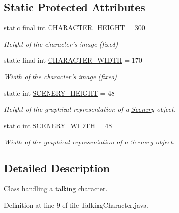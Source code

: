 \subsection*{Static Protected Attributes}
\begin{DoxyCompactItemize}
\item 
static final int \hyperlink{classworld_1_1character_1_1_character_a31596c03022d61aeb8aac56f149309be}{C\-H\-A\-R\-A\-C\-T\-E\-R\-\_\-\-H\-E\-I\-G\-H\-T} = 300
\begin{DoxyCompactList}\small\item\em Height of the character's image (fixed) \end{DoxyCompactList}\item 
static final int \hyperlink{classworld_1_1character_1_1_character_a2a46ba03b3e10896b7757f891336e8b8}{C\-H\-A\-R\-A\-C\-T\-E\-R\-\_\-\-W\-I\-D\-T\-H} = 170
\begin{DoxyCompactList}\small\item\em Width of the character's image (fixed) \end{DoxyCompactList}\item 
static int \hyperlink{classworld_1_1scenery_1_1_scenery_a106e53ae6e1647395740237ccce7f363}{S\-C\-E\-N\-E\-R\-Y\-\_\-\-H\-E\-I\-G\-H\-T} = 48
\begin{DoxyCompactList}\small\item\em Height of the graphical representation of a \hyperlink{classworld_1_1scenery_1_1_scenery}{Scenery} object. \end{DoxyCompactList}\item 
static int \hyperlink{classworld_1_1scenery_1_1_scenery_affb047c028883c6d069a03ef0f1caeb8}{S\-C\-E\-N\-E\-R\-Y\-\_\-\-W\-I\-D\-T\-H} = 48
\begin{DoxyCompactList}\small\item\em Width of the graphical representation of a \hyperlink{classworld_1_1scenery_1_1_scenery}{Scenery} object. \end{DoxyCompactList}\end{DoxyCompactItemize}


\subsection{Detailed Description}
Class handling a talking character. 

Definition at line 9 of file Talking\-Character.\-java.



